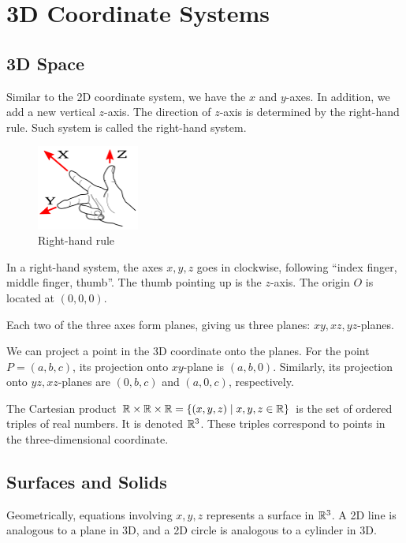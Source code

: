 \section{3D Coordinate Systems}

\subsection{3D Space}
Similar to the 2D coordinate system, we have the $x$ and $y$-axes. In addition, we add a new vertical $z$-axis. The direction of $z$-axis is determined by the right-hand rule. Such system is called the right-hand system.

\begin{figure}[h]
    \centering
    \includegraphics[width=0.3\textwidth]{figures/right-hand-rule.png}
    \caption{Right-hand rule}
\end{figure}
\hfill

In a right-hand system, the axes $x,y,z$ goes in clockwise, following ``index finger, middle finger, thumb''. The thumb pointing up is the $z$-axis. The origin $O$ is located at $(0,0,0)$.

Each two of the three axes form planes, giving us three planes: $xy,xz,yz$-planes.

We can project a point in the 3D coordinate onto the planes. For the point $P=(a,b,c)$, its projection onto $xy$-plane is $(a,b,0)$. Similarly, its projection onto $yz,xz$-planes are $(0,b,c)$ and $(a,0,c)$, respectively.

The Cartesian product ${\mathbb R}\times{\mathbb R}\times{\mathbb R} = \{(x,y,z) \mid x,y,z\in{\mathbb R}\}$ is the set of ordered triples of real numbers. It is denoted ${\mathbb R}^3$. These triples correspond to points in the three-dimensional coordinate.

\subsection{Surfaces and Solids}
Geometrically, equations involving $x,y,z$ represents a surface in ${\mathbb R}^3$. A 2D line is analogous to a plane in 3D, and a 2D circle is analogous to a cylinder in 3D.

